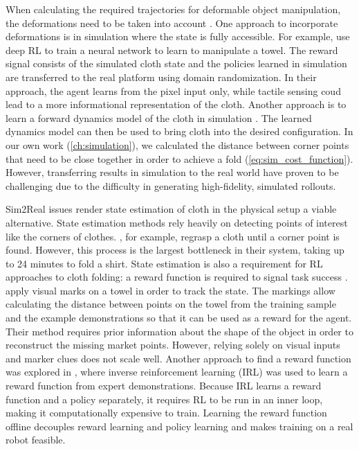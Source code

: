 \documentclass[\home/main.tex]{subfiles}
\begin{document}
When calculating the required trajectories for deformable object manipulation, the deformations need to be taken into account \autocite{Foresti2004}. One approach to incorporate deformations is in simulation where the state is fully accessible.
For example, \textcite{Matas2018} use deep \gls{RL} to train a neural network to learn to manipulate a towel. The reward signal consists of the simulated cloth state and the policies learned in simulation are transferred to the real platform using domain randomization. In their approach, the agent learns from the pixel input only, while tactile sensing coud lead to a more informational representation of the cloth. Another approach is to learn a forward dynamics model of the cloth in simulation \autocite{Tanaka2018}. The learned dynamics model can then be used to bring cloth into the desired configuration. In our own work (\cref{ch:simulation}), we calculated the distance between corner points that need to be close together in order to achieve a fold (\cref{eq:sim_cost_function}). However, transferring results in simulation to the real world have proven to be challenging due to the difficulty in generating high-fidelity, simulated rollouts.

Sim2Real issues render state estimation of cloth in the physical setup a viable alternative.
State estimation methods rely heavily on detecting points of interest like the corners of clothes. \textcite{Maitin2010}, for example, regrasp a cloth until a corner point is found. However, this process is the largest bottleneck in their system, taking up to 24 minutes to fold a shirt.
State estimation is also a requirement for \gls{RL} approaches to cloth folding: a reward function is required to signal task success \autocite{Tsurumine2019, Matas2018}.
\textcite{Balaguer2011} apply visual marks on a towel in order to track the state. The markings allow calculating the distance between points on the towel from the training sample and the example demonstrations so that it can be used as a reward for the agent. Their method requires prior information about the shape of the object in order to reconstruct the missing market points.
However, relying solely on visual inputs and marker clues does not scale well. Another approach to find a reward function was explored in \autocite{Abbeel2004, Finn2016}, where inverse reinforcement learning (IRL) was used to learn a reward function from expert demonstrations. Because IRL learns a reward function and a policy separately, it requires RL to be run in an inner loop, making it computationally expensive to train. Learning the reward function offline decouples reward learning and policy learning and makes training on a real robot feasible.
\end{document}
